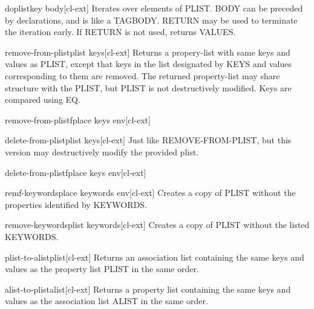 \documentclass[10pt,english]{book}
\begin{document}
\begin{macro}{doplist}{key \body body}[cl-ext]
  Iterates over elements of PLIST. BODY can be preceded by
declarations, and is like a TAGBODY. RETURN may be used to terminate
the iteration early. If RETURN is not used, returns VALUES.
\end{macro}

\begin{function}{remove-from-plist}{plist \rest keys}[cl-ext]
  Returns a propery-list with same keys and values as PLIST, except that keys
in the list designated by KEYS and values corresponding to them are removed.
The returned property-list may share structure with the PLIST, but PLIST is
not destructively modified. Keys are compared using EQ.
\end{function}

\begin{macro}{remove-from-plistf}{place \rest keys \env env}[cl-ext]
  
\end{macro}

\begin{function}{delete-from-plist}{plist \rest keys}[cl-ext]
  Just like REMOVE-FROM-PLIST, but this version may destructively modify the
provided plist.
\end{function}

\begin{macro}{delete-from-plistf}{place \rest keys \env env}[cl-ext]
  
\end{macro}

\begin{macro}{remf-keywords}{place \rest keywords \env env}[cl-ext]
  Creates a copy of PLIST without the properties identified by KEYWORDS.
\end{macro}

\begin{function}{remove-keywords}{plist \rest keywords}[cl-ext]
  Creates a copy of PLIST without the listed KEYWORDS.
\end{function}

\begin{function}{plist-to-alist}{plist}[cl-ext]
  Returns an association list containing the same keys and values as the
property list PLIST in the same order.
\end{function}

\begin{function}{alist-to-plist}{alist}[cl-ext]
  Returns a property list containing the same keys and values as the
association list ALIST in the same order.
\end{function}
\end{document}
